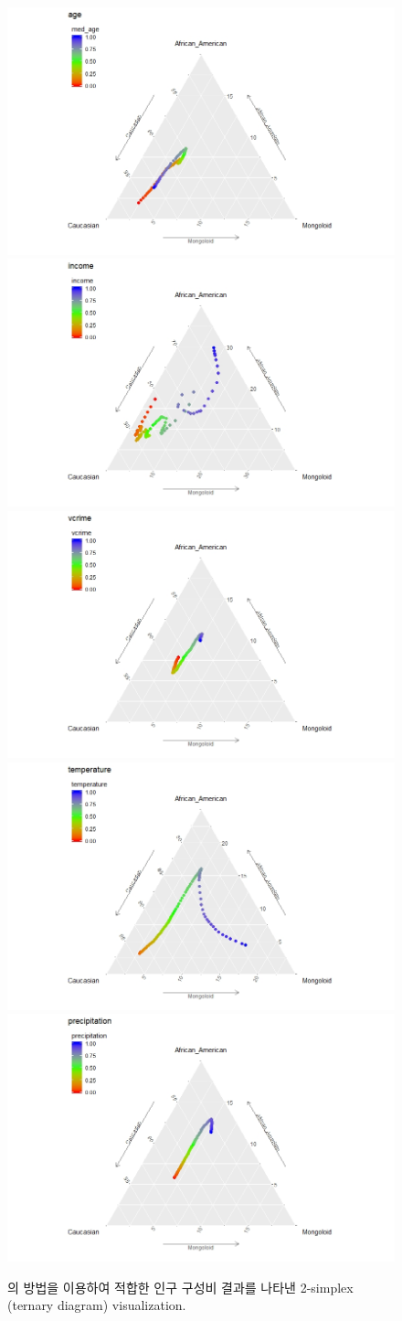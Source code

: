 \begin{figure}[h!]
	\centering
	\includegraphics[width=0.48\linewidth]{figs/p_age.jpeg}
	\hspace{.005\linewidth} 
	\includegraphics[width=0.48\linewidth]{figs/p_income.jpeg}
	\\[.5\baselineskip]
	\includegraphics[width=0.48\linewidth]{figs/p_vcrime.jpeg}
	\hspace{.005\linewidth} 
	\includegraphics[width=0.48\linewidth]{figs/p_temperature.jpeg}
	\\[.5\baselineskip]
	\includegraphics[width=0.48\linewidth]{figs/p_precipitation.jpeg}
	\caption{\citet{jeon2018additive}의 방법을 이용하여 적합한 인구 구성비 결과를 나타낸 2-simplex (ternary diagram) visualization.}\label{fig:results}
\end{figure}

